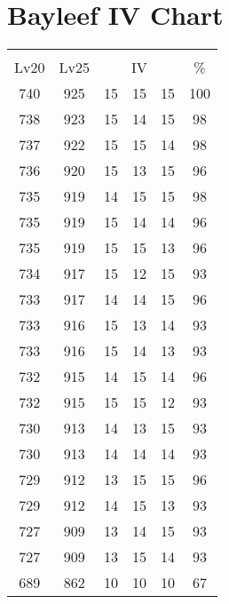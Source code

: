 \documentclass{article}%
\begin{document}
%
\normalsize%
\section{Bayleef IV Chart}%
\label{sec:Bayleef IV Chart}%
\renewcommand{\arraystretch}{1.5}%
\begin{tabular}{|c|c|c|c|c|c|}%
\hline%
\multicolumn{6}{|c|}{\textcolor{white}{ 
\linebreak{Bayleef}
}%
\cellcolor{black}}\\%
\multicolumn{1}{|c}{Lv20}&\multicolumn{1}{c|}{Lv25}&\multicolumn{3}{c|}{IV}&\multicolumn{1}{|c|}{\%}\\%
\hline%
\rowcolor{color100}%
740&925&15&15&15&100\\%
\hline%
\rowcolor{color98}%
738&923&15&14&15&98\\%
\hline%
\rowcolor{color98}%
737&922&15&15&14&98\\%
\hline%
\rowcolor{color96}%
736&920&15&13&15&96\\%
\hline%
\rowcolor{color98}%
735&919&14&15&15&98\\%
\hline%
\rowcolor{color96}%
735&919&15&14&14&96\\%
\hline%
\rowcolor{color96}%
735&919&15&15&13&96\\%
\hline%
\rowcolor{color93}%
734&917&15&12&15&93\\%
\hline%
\rowcolor{color96}%
733&917&14&14&15&96\\%
\hline%
\rowcolor{color93}%
733&916&15&13&14&93\\%
\hline%
\rowcolor{color93}%
733&916&15&14&13&93\\%
\hline%
\rowcolor{color96}%
732&915&14&15&14&96\\%
\hline%
\rowcolor{color93}%
732&915&15&15&12&93\\%
\hline%
\rowcolor{color93}%
730&913&14&13&15&93\\%
\hline%
\rowcolor{color93}%
730&913&14&14&14&93\\%
\hline%
\rowcolor{color96}%
729&912&13&15&15&96\\%
\hline%
\rowcolor{color93}%
729&912&14&15&13&93\\%
\hline%
\rowcolor{color93}%
727&909&13&14&15&93\\%
\hline%
\rowcolor{color93}%
727&909&13&15&14&93\\%
\hline%
\rowcolor{color91}%
689&862&10&10&10&67\\%
\end{tabular}

%
\end{document}
